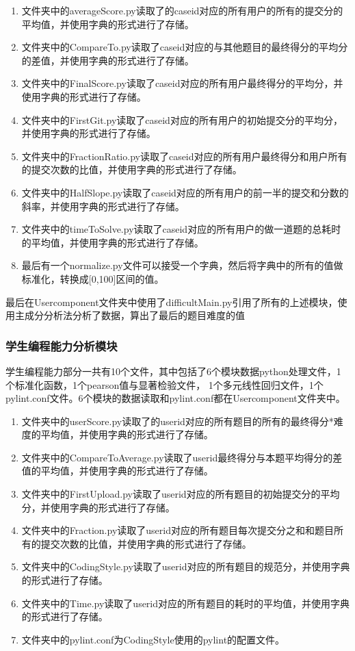 \documentclass[UTF8]{ctexart}
\begin{document}
\begin{enumerate}[(1)]

    \item 文件夹中的averageScore.py读取了的caseid对应的所有用户的所有的提交分的平均值，并使用字典的形式进行了存储。
    \item 文件夹中的CompareTo.py读取了caseid对应的与其他题目的最终得分的平均分的差值，并使用字典的形式进行了存储。
    \item 文件夹中的FinalScore.py读取了caseid对应的所有用户最终得分的平均分，并使用字典的形式进行了存储。
    \item 文件夹中的FirstGit.py读取了caseid对应的所有用户的初始提交分的平均分，并使用字典的形式进行了存储。
    \item 文件夹中的FractionRatio.py读取了caseid对应的所有用户最终得分和用户所有的提交次数的比值，并使用字典的形式进行了存储。
    \item 文件夹中的HalfSlope.py读取了caseid对应的所有用户的前一半的提交和分数的斜率，并使用字典的形式进行了存储。
    \item 文件夹中的timeToSolve.py读取了caseid对应的所有用户的做一道题的总耗时的平均值，并使用字典的形式进行了存储。
    \item 最后有一个normalize.py文件可以接受一个字典，然后将字典中的所有的值做标准化，转换成[0,100]区间的值。

\end{enumerate}
最后在Usercomponent文件夹中使用了difficultMain.py引用了所有的上述模块，使用主成分分析法分析了数据，算出了最后的题目难度的值
\subsubsection{学生编程能力分析模块}

学生编程能力部分一共有10个文件，其中包括了6个模块数据python处理文件，1个标准化函数，1个pearson值与显著检验文件，
1个多元线性回归文件，1个pylint.conf文件。6个模块的数据读取和pylint.conf都在Usercomponent文件夹中。

\begin{enumerate}

    \item 文件夹中的userScore.py读取了的userid对应的所有题目的所有的最终得分*难度的平均值，并使用字典的形式进行了存储。
    \item 文件夹中的CompareToAverage.py读取了userid最终得分与本题平均得分的差值的平均值，并使用字典的形式进行了存储。
    \item 文件夹中的FirstUpload.py读取了userid对应的所有题目的初始提交分的平均分，并使用字典的形式进行了存储。
    \item 文件夹中的Fraction.py读取了userid对应的所有题目每次提交分之和和题目所有的提交次数的比值，并使用字典的形式进行了存储。
    \item 文件夹中的CodingStyle.py读取了userid对应的所有题目的规范分，并使用字典的形式进行了存储。
    \item 文件夹中的Time.py读取了userid对应的所有题目的耗时的平均值，并使用字典的形式进行了存储。
    \item 文件夹中的pylint.conf为CodingStyle使用的pylint的配置文件。

\end{enumerate}
\end{document}
